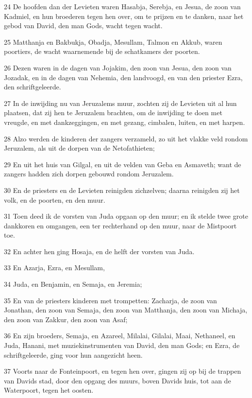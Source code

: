 \par 24 De hoofden dan der Levieten waren Hasabja, Serebja, en Jesua, de zoon van Kadmiel, en hun broederen tegen hen over, om te prijzen en te danken, naar het gebod van David, den man Gods, wacht tegen wacht.
\par 25 Matthanja en Bakbukja, Obadja, Mesullam, Talmon en Akkub, waren poortiers, de wacht waarnemende bij de schatkamers der poorten.
\par 26 Dezen waren in de dagen van Jojakim, den zoon van Jesua, den zoon van Jozadak, en in de dagen van Nehemia, den landvoogd, en van den priester Ezra, den schriftgeleerde.
\par 27 In de inwijding nu van Jeruzalems muur, zochten zij de Levieten uit al hun plaatsen, dat zij hen te Jeruzalem brachten, om de inwijding te doen met vreugde, en met dankzeggingen, en met gezang, cimbalen, luiten, en met harpen.
\par 28 Alzo werden de kinderen der zangers verzameld, zo uit het vlakke veld rondom Jeruzalem, als uit de dorpen van de Netofathieten;
\par 29 En uit het huis van Gilgal, en uit de velden van Geba en Asmaveth; want de zangers hadden zich dorpen gebouwd rondom Jeruzalem.
\par 30 En de priesters en de Levieten reinigden zichzelven; daarna reinigden zij het volk, en de poorten, en den muur.
\par 31 Toen deed ik de vorsten van Juda opgaan op den muur; en ik stelde twee grote dankkoren en omgangen, een ter rechterhand op den muur, naar de Mistpoort toe.
\par 32 En achter hen ging Hosaja, en de helft der vorsten van Juda.
\par 33 En Azarja, Ezra, en Mesullam,
\par 34 Juda, en Benjamin, en Semaja, en Jeremia;
\par 35 En van de priesters kinderen met trompetten: Zacharja, de zoon van Jonathan, den zoon van Semaja, den zoon van Matthanja, den zoon van Michaja, den zoon van Zakkur, den zoon van Asaf;
\par 36 En zijn broeders, Semaja, en Azareel, Milalai, Gilalai, Maai, Nethaneel, en Juda, Hanani, met muziekinstrumenten van David, den man Gods; en Ezra, de schriftgeleerde, ging voor hun aangezicht heen.
\par 37 Voorts naar de Fonteinpoort, en tegen hen over, gingen zij op bij de trappen van Davids stad, door den opgang des muurs, boven Davids huis, tot aan de Waterpoort, tegen het oosten.
